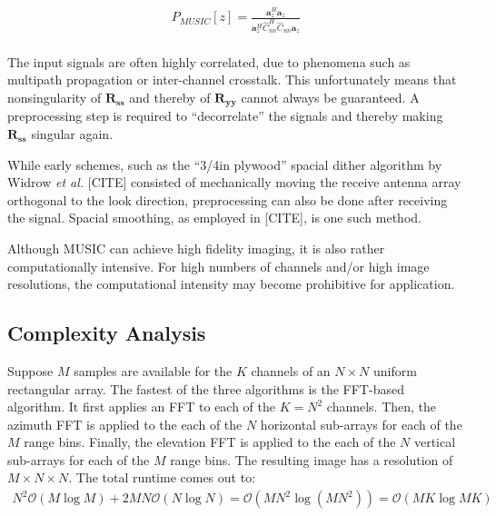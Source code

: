 \begin{align}
    P_{MUSIC}[z] = \frac{\mathbf{a}_z^H \mathbf{a}_z}{\mathbf{a}_z^H\hat C_{nn}^H\hat C_{nn}\mathbf{a}_z}
\end{align} \\

The input signals are often highly correlated, due to phenomena such as multipath propagation or inter-channel crosstalk.
This unfortunately means that nonsingularity of $\mathbf{R_{ss}}$ and thereby of  $\mathbf{R_{yy}}$ cannot always be guaranteed.
A preprocessing step is required to ``decorrelate'' the signals and thereby making $\mathbf{R_{ss}}$ singular again.

While early schemes, such as the ``3/4in plywood'' spacial dither algorithm by Widrow \textit{et al.} [CITE]
consisted of mechanically moving the receive antenna array orthogonal to the look direction,
preprocessing can also be done after receiving the signal. Spacial smoothing, as employed in [CITE], is one such method.

Although MUSIC can achieve high fidelity imaging,
it is also rather computationally intensive.
For high numbers of channels and/or high image resolutions,
the computational intensity may become prohibitive for application.

\subsection{Complexity Analysis}
\label{sec:complexity_analysis}
Suppose $M$ samples are available for the $K$ channels of an $N\times N$ uniform rectangular array.
The fastest of the three algorithms is the FFT-based algorithm.
It first applies an FFT to each of the $K=N^2$ channels.
Then, the azimuth FFT is applied to the each of the $N$ horizontal sub-arrays for each of the $M$ range bins.
Finally, the elevation FFT is applied to the each of the $N$ vertical sub-arrays for each of the $M$ range bins.
The resulting image has a resolution of $M \times N \times N$.
The total runtime comes out to:
\begin{align}
    N^2 \mathcal O(M \log M) + 2MN \mathcal O(N \log N) = \mathcal O \left(MN^2\log (MN^2) \right) = \mathcal O (MK \log MK)
\end{align}

